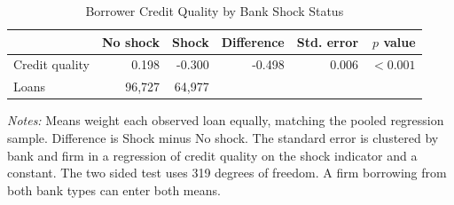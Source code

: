 \begin{table}[H]
\centering
\caption{Borrower Credit Quality by Bank Shock Status}
\label{tab:q3_quality_sorting}
\small
\begin{tabular*}{\linewidth}{@{\extracolsep{\fill}}lrrrrr@{}}
\toprule
 & No shock & Shock & Difference & Std. error & $p$ value \\
\midrule
Credit quality & 0.198 & -0.300 & -0.498 & 0.006 & $<0.001$ \\
Loans & 96,727 & 64,977 & & & \\
\bottomrule
\end{tabular*}
\par\smallskip
\begin{minipage}{\linewidth}\footnotesize
\textit{Notes:} Means weight each observed loan equally, matching the pooled regression sample. Difference is Shock minus No shock. The standard error is clustered by bank and firm in a regression of credit quality on the shock indicator and a constant. The two sided test uses 319 degrees of freedom. A firm borrowing from both bank types can enter both means.
\end{minipage}
\end{table}

